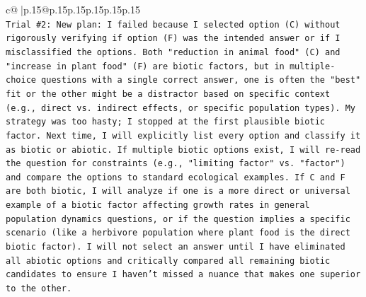 \documentclass{article}
\begin{document}
{\begin{supertabular}{c@{$\;$}|p{.15\linewidth}@{}p{.15\linewidth}p{.15\linewidth}p{.15\linewidth}p{.15\linewidth}p{.15\linewidth}}
{{{\\ 
\texttt{Trial \#2: New plan: I failed because I selected option (C) without rigorously verifying if option (F) was the intended answer or if I misclassified the options. Both "reduction in animal food" (C) and "increase in plant food" (F) are biotic factors, but in multiple{-}choice questions with a single correct answer, one is often the "best" fit or the other might be a distractor based on specific context (e.g., direct vs. indirect effects, or specific population types). My strategy was too hasty; I stopped at the first plausible biotic factor. Next time, I will explicitly list every option and classify it as biotic or abiotic. If multiple biotic options exist, I will re{-}read the question for constraints (e.g., "limiting factor" vs. "factor") and compare the options to standard ecological examples. If C and F are both biotic, I will analyze if one is a more direct or universal example of a biotic factor affecting growth rates in general population dynamics questions, or if the question implies a specific scenario (like a herbivore population where plant food is the direct biotic factor). I will not select an answer until I have eliminated all abiotic options and critically compared all remaining biotic candidates to ensure I haven't missed a nuance that makes one superior to the other.} \\
\\ 
}}}
\end{supertabular}}
\end{document}
